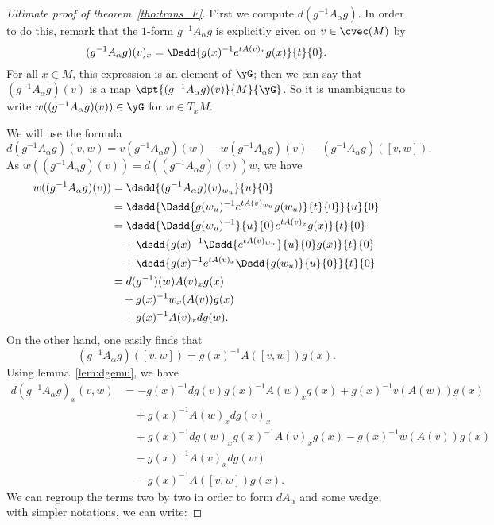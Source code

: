 \begin{proof}[Ultimate proof of theorem~\ref{tho:trans_F}]
	First we compute $d(g^{-1} A_{\alpha} g)$. In order to do this, remark that the $1$-form $g^{-1} A_{\alpha} g$ is explicitly given on $v\in\cvec(M)$ by
	\[
		(g^{-1} A_{\alpha} g)(v)_x=\Dsdd{g(x)^{-1} e^{tA(v)_x}g(x)}{t}{0}.
	\]
	For all $x\in M$, this expression is an element of $\yG$; then we can say that $(g^{-1} A_{\alpha} g)(v)$ is a map $\dpt{(g^{-1} A_{\alpha} g)(v)}{M}{\yG}$. So it is unambiguous to write $w((g^{-1} A_{\alpha} g)(v))\in\yG$ for $w\in T_xM$.

	We will use the formula
	\[
		d(g^{-1} A_{\alpha} g)(v,w)=v(g^{-1} A_{\alpha} g)(w)-w(g^{-1} A_{\alpha} g)(v)-(g^{-1} A_{\alpha} g)([v,w]).
	\]
	As $w((g^{-1} A_{\alpha} g)(v))=d((g^{-1} A_{\alpha} g)(v))w$, we have
	\begin{equation}
		\begin{split}
			w((g^{-1} A_{\alpha} g)(v))&=\dsdd{(g^{-1} A_{\alpha} g)(v)_{w_u}}{u}{0}\\
			&=\dsdd{ \Dsdd{g(w_u)^{-1} e^{tA(v)_{w_u}}g(w_u)}{t}{0}  }{u}{0}\\
			&=\dsdd{  \Dsdd{g(w_u)^{-1}}{u}{0} e^{tA(v)_x}g(x)  }{t}{0}\\
			&\quad+\dsdd{ g(x)^{-1} \Dsdd{e^{tA(v)_{w_u}}}{u}{0} g(x)  }{t}{0}\\
			&\quad+\dsdd{  g(x)^{-1} e^{tA(v)_x} \Dsdd{g(w_u)}{u}{0}  }{t}{0}\\
			&=d(g^{-1})(w)A(v)_xg(x)\\
			&\quad+g(x)^{-1} w_x(A(v))g(x)\\
			&\quad+g(x)^{-1} A(v)_x dg(w).
		\end{split}
	\end{equation}
	On the other hand, one easily finds that
	\[
		(g^{-1} A_{\alpha} g)([v,w])=g(x)^{-1} A([v,w])g(x).
	\]
	Using lemma~\ref{lem:dgemu}, we have
	\begin{equation}
		\begin{split}
			d(g^{-1} A_{\alpha} g)_x(v,w)&=-g(x)^{-1} dg(v)g(x)^{-1} A(w)_xg(x)+g(x)^{-1} v(A(w))g(x)\\&\quad+g(x)^{-1} A(w)_xdg(v)_x\\
			&\quad+g(x)^{-1} dg(w)_xg(x)^{-1} A(v)_xg(x)-g(x)^{-1} w(A(v))g(x)\\&\quad-g(x)^{-1} A(v)_xdg(w)\\
			&\quad-g(x)^{-1} A([v,w])g(x).
		\end{split}
	\end{equation}
	We can regroup the terms two by two in order to form $dA_{\alpha}$ and some wedge; with simpler notations, we can write:

\end{proof}
